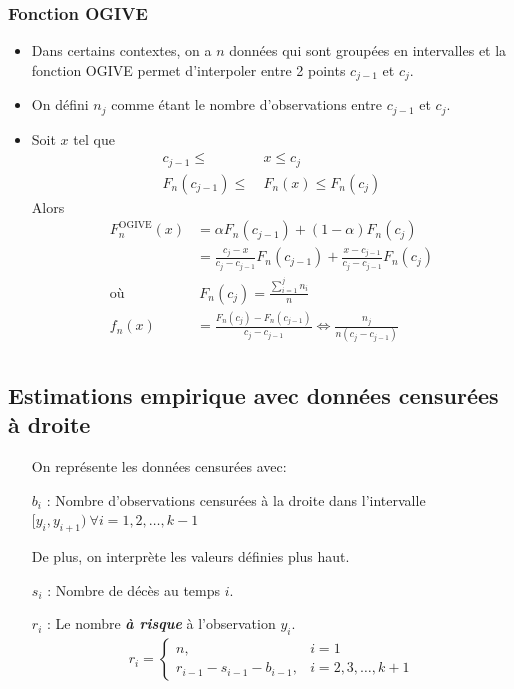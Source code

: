 \documentclass[10pt, french]{article}
\begin{document}
\begin{multicols*}{3}
\subsubsection*{Fonction OGIVE}
\begin{itemize}
    \item Dans certains contextes, on a $n$ données qui sont groupées en intervalles et la fonction OGIVE permet d'interpoler entre 2 points $c_{j - 1}$ et $c_j$.
    \item On défini $n_j$ comme étant le nombre d'observations entre $c_{j - 1}$ et $c_{j}$.
    \item Soit $x$ tel que
    \begin{align*}
    		c_{j - 1} \le &\ x \le c_j \\
    		F_{n	}(c_{j - 1}) \le &\ F_{n}(x) \le F_{n}(c_{j}) 
    \end{align*}
    Alors 
    \begin{align*}
		F_{n}^{\text{OGIVE}}(x) &= \alpha F_{n}(c_{j - 1}) + (1 - \alpha) F_{n}(c_{j}) \\
		&= \frac{c_{j} - x}{c_{j} - c_{j - 1}} F_{n}(c_{j - 1}) + \frac{x - c_{j - 1}}{c_{j} - c_{j - 1}} F_{n}(c_{j}) \\
       	\text{où } &\ F_{n}(c_j) = \frac{\sum_{i = 1}^{j} n_{i}}{n} \\
       	f_n(x) &= \frac{F_{n}(c_{j}) - F_{n}(c_{j - 1})}{c_{j} - c_{j - 1}} \Leftrightarrow \frac{n_j}{n(c_{j} - c_{j - 1})} \\
    \end{align*}
\end{itemize}

\subsection*{Estimations empirique avec données censurées à droite}

\begin{enumerate}
	\item [] On représente les données censurées avec:
	\item[$b_{i}$ : ] Nombre d'observations censurées à la droite dans l'intervalle $[y_{i}, y_{i + 1}) \ \forall i = 1, 2, \dots, k - 1$
	\item[] De plus, on interprète les valeurs définies plus haut.
	\item[$s_i$ : ] Nombre de décès au temps $i$.
	\item[$r_i$ : ] Le nombre \textit{\textbf{à risque}} à l'observation $y_{i}$.
\begin{align*}
	r_{i} = 
		\begin{cases}
			n, & i = 1 \\
			r_{i - 1} - s_{i - 1} - b_{i - 1}, & i = 2, 3, \dots, k + 1
		\end{cases}
\end{align*}
\end{enumerate}


\end{multicols*}
\end{document}
